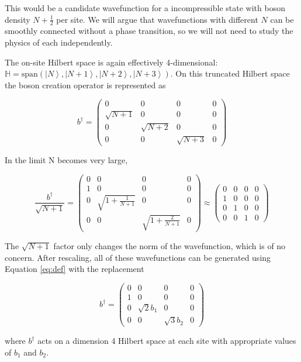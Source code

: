 \documentclass{article}
\newcommand{\ket}[1]{\left |#1 \right \rangle}
\begin{document}
\begin{itemize}
This would be a candidate wavefunction for a incompressible state with boson density $N+\frac{1}{2}$ per site. We will argue that wavefunctions with different $N$ can be smoothly connected without a phase transition, so we will not need to study the physics of each independently. 

The on-site Hilbert space is again effectively 4-dimensional:  $ \mathbb{H} = \text{span} ( \ket{N}, \ket{N+1}, \ket{N+2}, \ket{N+3} )$. On this truncated Hilbert space the boson creation operator is represented as 

$$
b^{\dagger} 
=  
\left( \begin{array}{cccc}
0 & 0 & 0 & 0 \\
\sqrt{N+1} & 0 & 0 & 0 \\
0 & \sqrt{N+2} & 0 & 0 \\
0 & 0 & \sqrt{N+3} & 0 \end{array} \right) 
$$

In the limit N becomes very large,

$$
\frac{b^{\dagger}}{\sqrt{N+1}} 
=  
\left( \begin{array}{cccc}
0 & 0 & 0 & 0 \\
1 & 0 & 0 & 0 \\
0 & \sqrt{1+\frac{1}{N+1}} & 0 & 0 \\
0 & 0 & \sqrt{1+\frac{2}{N+1}} & 0 \end{array} \right) 
\approx 
\left( \begin{array}{cccc}
0 & 0 & 0 & 0 \\
1 & 0 & 0 & 0 \\
0 & 1 & 0 & 0 \\
0 & 0 & 1 & 0 \end{array} \right) 
$$

The $\sqrt{N+1}$ factor only changes the norm of the wavefunction, which is of no concern. After rescaling, all of these wavefunctions can be generated using Equation \ref{eq:def} with the replacement
 
\begin{equation}
b^{\dagger} = 
\left( \begin{array}{cccc}
0 & 0 & 0 & 0 \\
1 & 0 & 0 & 0 \\
0 & \sqrt{2} b_1 & 0 & 0 \\
0 & 0 & \sqrt{3} b_2 & 0 \end{array} \right) 
\label{eq:b}
\end{equation}

where $b^{\dagger}$ acts on a dimension 4 Hilbert space at each site with appropriate values of $b_1$ and $b_2$.

\end{itemize}
\end{document}
